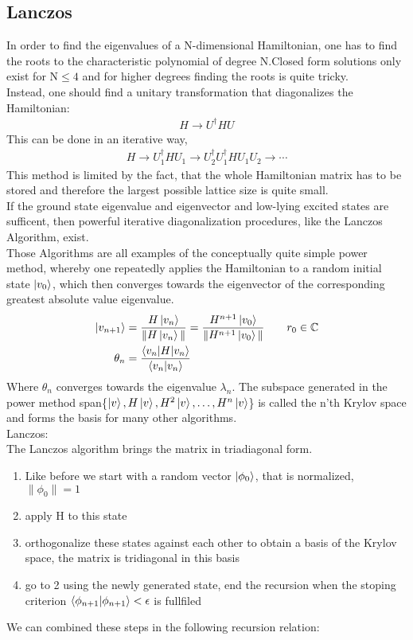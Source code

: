 \documentclass{article}
\begin{document}
\subsection{Lanczos}
In order to find the eigenvalues of a N-dimensional Hamiltonian, one
has to find the roots to the characteristic polynomial of degree
N.Closed form solutions only exist for N$\leq4$ and for higher degrees
finding the roots is quite tricky.\\
Instead, one should find a unitary transformation that diagonalizes
the Hamiltonian:
\begin{align*}
H \to U^{\dagger} H U
\end{align*}
This can be done in an iterative way,
\begin{align*}
H \to U_1^{\dagger} H U_1 \to U_2^{\dagger}U_1^{\dagger} H U_1U_2 \to \dotsm
\end{align*}
This method is limited by the fact, that the whole Hamiltonian matrix
has to be stored and therefore the largest possible lattice size is
quite small.\\
If the ground state eigenvalue and eigenvector and low-lying excited
states are sufficent, then powerful iterative diagonalization
procedures, like the Lanczos Algorithm, exist.\\
Those Algorithms are all examples of the conceptually quite simple
power method,
whereby one repeatedly applies the Hamiltonian to a random initial
state $\ket{v_0}$, which then converges towards the eigenvector of the
corresponding greatest absolute value eigenvalue.
\begin{align*}
\ket{v_{n+1}} &= \frac{H \ket{v_n}}{\| H \ket{v_n} \|} =\frac{H^{n+1} \ket{v_0}}{\| H^{n+1} \ket{v_0} \|}  \qquad r_0 \in \mathbb{C}\\
\theta_n &= \frac{\braket{v_n|H|v_n}}{\braket{v_n|v_n}}
\end{align*}
Where $\theta_n$ converges towards the eigenvalue $\lambda_n$. The
subspace generated in the power method
 span\{$\ket{v},H \ket{v}, H^2 \ket{v}, \dotsc,H^n \ket{v}$\} 
is called the n'th Krylov space and forms the basis for many other
algorithms.\\
Lanczos:\\
The Lanczos algorithm brings the matrix in triadiagonal form.
\begin{enumerate}
\item\label{item:1} Like before we start with a random vector
  $\ket{\phi_0}$, that is normalized, $\|\phi_0\| = 1$
\item\label{item:2} apply H to this state
\item\label{item:3} orthogonalize these states against each other to
  obtain a basis of the Krylov space, the matrix is tridiagonal in this basis
\item\label{item:4} go to 2 using the newly generated state, end the
  recursion when the stoping criterion $\braket{\phi_{n+1}|\phi_{n+1}}
  < \epsilon$ is fullfiled 

\end{enumerate}
We can combined these steps in the following recursion relation:
\end{document}
